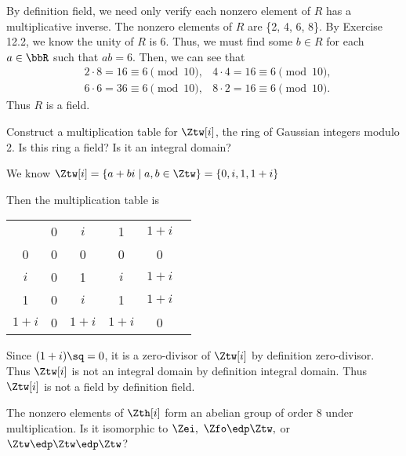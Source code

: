\documentclass{article}
\begin{document}
\begin{solution} %
  By definition field, we need only verify each nonzero element of \( R \) has a multiplicative inverse. The nonzero elements of \( R \) are \{2, 4, 6, 8\}. By Exercise 12.2, we know the unity of \( R \) is 6. Thus, we must find some \( b\in R \) for each \( a\in\bbR \) such that \( ab = 6 \). Then, we can see that \begin{align*}
    &2\cdot 8 = 16 \equiv 6 \pmod{10}, &4\cdot 4 = 16 \equiv 6 \pmod{10}, \\
    &6\cdot 6 = 36 \equiv 6 \pmod{10}, &8\cdot 2 = 16 \equiv 6 \pmod{10}.
  \end{align*}
  Thus \( R \) is a field.
\end{solution}

Construct a multiplication table for \( \Ztw[i] \), the ring of Gaussian integers modulo 2. Is this ring a field? Is it an integral domain?

\begin{solution} %
  We know \( \Ztw[i] = \{a+bi\mid a,b\in\Ztw\} = \{0, i, 1, 1+i\} \)

  Then the multiplication table is
  \begin{center}
    \begin{tabular}{c | c c c c c}
                  & 0       & \( i \)   & 1         & \( 1+i \) \\ \cline{1-5}
        0         & 0       & 0         & 0         & 0  \\
        \( i \)   & 0       & 1         & \( i \)   & \( 1+i \)  \\
        1         & 0       & \( i \)   & 1         & \( 1+i \)  \\
        \( 1+i \) & 0       & \( 1+i \) & \( 1+i \) & 0
    \end{tabular}
  \end{center}
  Since \( (1+i)\sq = 0 \), it is a zero-divisor of \( \Ztw[i] \) by definition zero-divisor. Thus \( \Ztw[i] \) is not an integral domain by definition integral domain.
  Thus \( \Ztw[i] \) is not a field by definition field.
\end{solution}

The nonzero elements of \( \Zth[i] \) form an abelian group of order 8 under multiplication. Is it isomorphic to \( \Zei,\ \Zfo\edp\Ztw, \) or \( \Ztw\edp\Ztw\edp\Ztw \)?
\end{document}
